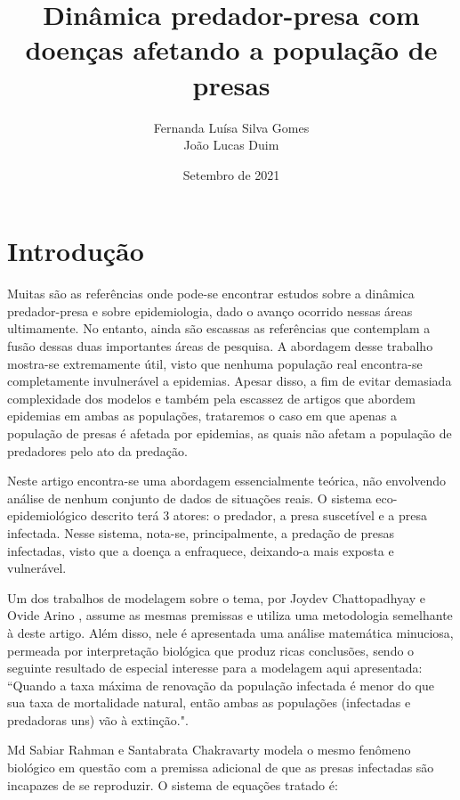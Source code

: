 \documentclass{article}
\title{Dinâmica predador-presa com doenças afetando a população de presas}
\author{Fernanda Luísa Silva Gomes \\ João Lucas Duim}
\date{Setembro de 2021}
\begin{document}
\maketitle

\section{Introdução}
Muitas são as referências onde pode-se encontrar estudos sobre a dinâmica predador-presa e sobre epidemiologia, dado o avanço ocorrido nessas áreas ultimamente. No entanto, ainda são escassas as referências que contemplam a fusão dessas duas importantes áreas de pesquisa. A abordagem desse trabalho mostra-se extremamente útil, visto que nenhuma população real encontra-se completamente invulnerável a epidemias. Apesar disso, a fim de evitar demasiada complexidade dos modelos e também pela escassez de artigos que abordem epidemias em ambas as populações, trataremos o caso em que apenas a população de presas é afetada por epidemias, as quais não afetam a população de predadores pelo ato da predação.

Neste artigo encontra-se uma abordagem essencialmente teórica, não envolvendo análise de nenhum conjunto de dados de situações reais. O sistema eco-epidemiológico descrito terá $3$ atores: o predador, a presa suscetível e a presa infectada. Nesse sistema, nota-se, principalmente, a predação de presas infectadas, visto que a doença a enfraquece, deixando-a mais exposta e vulnerável.

Um dos trabalhos de modelagem sobre o tema, por  Joydev Chattopadhyay e Ovide Arino \cite{chattopadhyay}, assume as mesmas premissas e utiliza uma metodologia semelhante à deste artigo. Além disso, nele é apresentada uma análise matemática minuciosa, permeada por interpretação biológica que produz ricas conclusões, sendo o seguinte resultado de especial interesse para a modelagem aqui apresentada: ``Quando a taxa máxima de renovação da população infectada é menor do que sua taxa de mortalidade natural, então ambas as populações (infectadas e predadoras uns) vão à extinção.".

Md Sabiar Rahman e Santabrata Chakravarty \cite{rahman} modela o mesmo fenômeno biológico em questão com a premissa adicional de que as presas infectadas são incapazes de se reproduzir. O sistema de equações tratado é:
\end{document}
